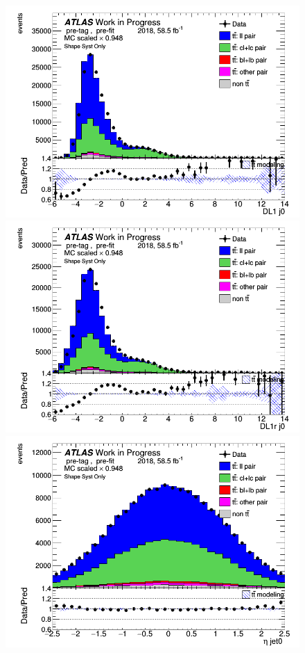 \documentclass[letterpaper,12pt]{article}
\begin{document}
\begin{figure}[H]
\begin{minipage}[b]{.45\textwidth}
\centering
\includegraphics[width=1\textwidth]{Distribution_March_highpT/DataMC_J0_DL1.png}
\end{minipage}\hfill
\begin{minipage}[b]{.45\textwidth}
\centering
\includegraphics[width=1\textwidth]{Distribution_March_highpT/DataMC_J0_DL1r.png}
\end{minipage}\hfill
\begin{minipage}[b]{.45\textwidth}
\centering
\includegraphics[width=1\textwidth]{Distribution_March_highpT/DataMC_J0_eta.png}

\end{minipage}
\end{figure}
\end{document}
